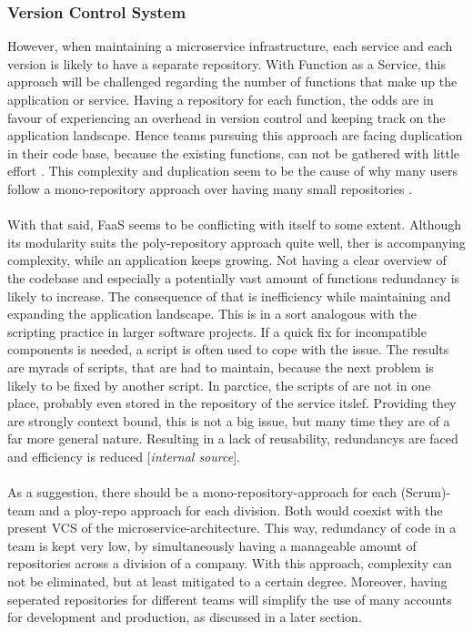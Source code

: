 \documentclass[a4paper,twoside,11pt, pagesize]{scrartcl}
\begin{document}
\subsubsection{Version Control System}
 However, when maintaining a microservice infrastructure, each service and each version is likely to have a separate repository. With Function as a Service, this approach will be challenged regarding the number of functions that make up the application or service. Having a repository for each function, the odds are in favour of experiencing an overhead in version control and keeping track on the application landscape. Hence teams pursuing this approach are facing duplication in their code base, because the existing functions, can not be gathered with little effort \cite{racicot2019quality}. This complexity and duplication seem to be the cause of why many users follow a mono-repository approach over having many small repositories \cite{brousse2019issue}.\\\\ With that said, FaaS seems to be conflicting with itself to some extent. Although its modularity suits the poly-repository approach quite well, ther is accompanying complexity, while an application keeps growing. Not having a clear overview of the codebase and especially a potentially vast amount of functions redundancy is likely to increase. The consequence of that is inefficiency while maintaining and expanding the application landscape. This is in a sort analogous with the scripting practice in larger software projects. If a quick fix for incompatible components is needed, a script is often used to cope with the issue. The results are myrads of scripts, that are had to maintain, because the next problem is likely to be fixed by another script. In parctice, the scripts of are not in one place, probably even stored in the repository of the service itslef. Providing they are strongly context bound, this is not a big issue, but many time they are of a far more general nature. Resulting in a lack of reusability, redundancys are faced and efficiency is reduced [\textit{internal source}].\\\\ As a suggestion, there should be a mono-repository-approach for each (Scrum)-team and a ploy-repo approach for each division. Both would coexist with the present VCS of the microservice-architecture. This way, redundancy of code in a team is kept very low, by simultaneously having a manageable amount of repositories across a division of a company. With this approach, complexity can not be eliminated, but at least mitigated to a certain degree. Moreover, having seperated repositories for different teams will simplify the use of many accounts for development and production, as discussed in a later section.\\\\ 
\end{document}
